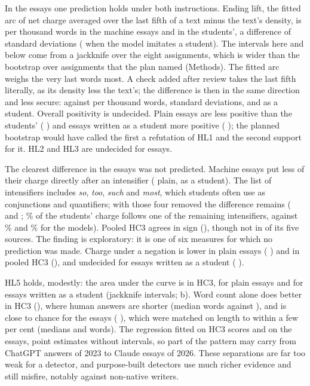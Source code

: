 In the essays one prediction holds under both instructions. Ending lift, the fitted arc of net charge averaged over the last fifth of a text minus the text's density, is \esLiftMachineA{} per thousand words in the machine essays and \esLiftHumanA{} in the students', a difference of \ejEndingLiftA{} \ejEndingLiftACI{} standard deviations (\ejEndingLiftB{} \ejEndingLiftBCI{} when the model imitates a student). The intervals here and below come from a jackknife over the eight assignments, which is wider than the bootstrap over assignments that the plan named (Methods). The fitted arc weighs the very last words most. A check added after review takes the last fifth literally, as its density less the text's; the difference is then in the same direction and less secure: \esExactMachineA{} against \esExactHumanA{} per thousand words, \ejExactA{} \ejExactACI{} standard deviations, and \ejExactB{} \ejExactBCI{} as a student. Overall positivity is undecided. Plain essays are less positive than the students' (\ejNetA{} \ejNetACI) and essays written as a student more positive (\ejNetB{} \ejNetBCI); the planned bootstrap would have called the first a refutation of HL1 and the second support for it. HL2 and HL3 are undecided for essays.

The clearest difference in the essays was not predicted. Machine essays put less of their charge directly after an intensifier (\ejIntensifiedA{} \ejIntensifiedACI{} plain, \ejIntensifiedB{} \ejIntensifiedBCI{} as a student). The list of intensifiers includes \emph{so}, \emph{too}, \emph{such} and \emph{most}, which students often use as conjunctions and quantifiers; with those four removed the difference remains (\ejStrictA{} \ejStrictACI{} and \ejStrictB{} \ejStrictBCI; \esStrictHumanA\% of the students' charge follows one of the remaining intensifiers, against \esStrictMachineA\% and \esStrictMachineB\% for the models). Pooled HC3 agrees in sign (\hcIntensified), though not in \hcBoostPositive{} of its five sources. The finding is exploratory: it is one of six measures for which no prediction was made. Charge under a negation is lower in plain essays (\ejNegatedA{} \ejNegatedACI) and in pooled HC3 (\hcNegated), and undecided for essays written as a student (\ejNegatedB{} \ejNegatedBCI).

HL5 holds, modestly: the area under the curve is \hcAuc{} in HC3, \esAucA{} \esAucACIjack{} for plain essays and \esAucB{} \esAucBCIjack{} for essays written as a student (jackknife intervals; b). Word count alone does better in HC3 (\hcAucWords), where human answers are shorter (median \hcWordsHuman{} words against \hcWordsMachine), and is close to chance for the essays (\esAucWordsA{} \esAucWordsACIjack), which were matched on length to within a few per cent (medians \esWordsHumanA{} and \esWordsMachineA{} words). The regression fitted on HC3 scores \esHcA{} and \esHcB{} on the essays, point estimates without intervals, so part of the pattern may carry from ChatGPT answers of 2023 to Claude essays of 2026. These separations are far too weak for a detector, and purpose-built detectors use much richer evidence and still misfire, notably against non-native writers\cite{liang2023,weberwulff2023}.

